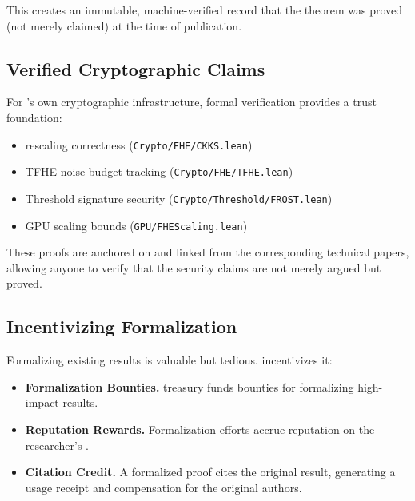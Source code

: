 This creates an immutable, machine-verified record that the theorem was proved (not merely claimed) at the time of publication.

\subsection{Verified Cryptographic Claims}

For \Zoo{}'s own cryptographic infrastructure, formal verification provides a trust foundation:

\begin{itemize}
    \item \CKKS{} rescaling correctness (\texttt{Crypto/FHE/CKKS.lean}) \cite{zoo-fhe}
    \item \textsc{TFHE} noise budget tracking (\texttt{Crypto/FHE/TFHE.lean})
    \item Threshold signature security (\texttt{Crypto/Threshold/FROST.lean})
    \item GPU scaling bounds (\texttt{GPU/FHEScaling.lean})
\end{itemize}

These proofs are anchored on \IChain{} and linked from the corresponding technical papers, allowing anyone to verify that the security claims are not merely argued but proved.

\subsection{Incentivizing Formalization}

Formalizing existing results is valuable but tedious. \Zoo{} incentivizes it:

\begin{itemize}
    \item \textbf{Formalization Bounties.} \DAO{} treasury funds bounties for formalizing high-impact results.
    \item \textbf{Reputation Rewards.} Formalization efforts accrue reputation on the researcher's \DID{}.
    \item \textbf{Citation Credit.} A formalized proof cites the original result, generating a usage receipt and compensation for the original authors.
\end{itemize}

